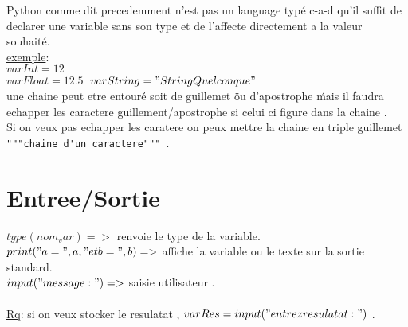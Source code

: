\documentclass[a4paper,12pt,openany]{book}
\begin{document}
Python comme dit precedemment n'est pas un language typé c-a-d qu'il suffit de declarer une variable sans son type et de l'affecte directement a la valeur souhaité.\\
\underline{exemple}:\\
$varInt = 12$\\
$varFloat = 12.5$\
$varString = "StringQuelconque"$\
\\
une chaine peut etre entouré soit de guillemet \" ou d'apostrophe \' mais il faudra echapper les caractere guillement/apostrophe si celui ci figure dans la chaine .\\
Si on veux pas echapper les caratere on peux mettre la chaine en triple guillemet \verb+ """chaine d'un caractere""" +.\\

\section{Entree/Sortie}
$type(nom_var) => $ renvoie le type de la variable.\\
$print("a =", a, "et b =", b) => $ affiche la variable ou le texte sur la sortie standard.\\
$input("message : ") => $ saisie utilisateur .\\
\\
\underline{Rq}: si on veux stocker le resulatat , $varRes=input("entrez resulatat : ")$ .\\
\\

\end{document}
